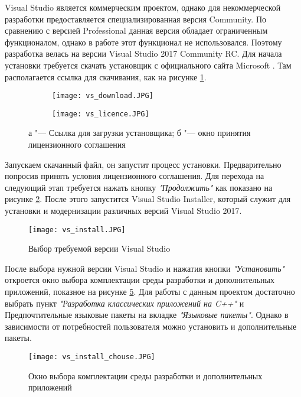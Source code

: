 Visual Studio является коммерческим проектом, однако для некоммерческой разработки предоставляется специализированная версия Community. По сравнению с версией Professional данная версия обладает ограниченным функционалом, однако в работе этот функционал не использовался. Поэтому разработка велась на версии Visual Studio 2017 Community RC. Для начала установки требуется скачать установщик с официального сайта Microsoft \cite{vs_downolad}. Там располагается ссылка для скачивания, как на рисунке \ref{fig:vs_downolad}. 
\begin{figure}[h]
    \centering
     \begin{subfigure}{0.45\textwidth}  
         \centering     
        \texttt{[image: vs\_download.JPG]}
        \caption{}
        \label{fig:vs_downolad}
    \end{subfigure}
    \begin{subfigure}{0.45\textwidth}  
        \centering
        \texttt{[image: vs\_licence.JPG]}
        \caption{}
        \label{fig:vs_licence}
    \end{subfigure}
    \caption{а "--- Ссылка для загрузки установщика; б "--- окно принятия лицензионного соглашения}
    \label{fig:vs_install1}
\end{figure}
Запускаем скачанный файл, он запустит процесс установки. Предварительно попросив принять условия лицензионного соглашения. Для перехода на следующий этап требуется нажать кнопку \textit{"Продолжить"} как показано на рисунке \ref{fig:vs_licence}. После этого запустится Visual Studio Installer, который служит для установки и модернизации различных версий Visual Studio 2017.
\begin{figure}[h]
    \centering   
    \texttt{[image: vs\_install.JPG]} 
    \caption{Выбор требуемой версии Visual Studio}
    \label{fig:vs_install2}
\end{figure}
После выбора нужной версии Visual Studio и нажатия кнопки \textit{"Установить"} откроется окно выбора комплектации среды разработки и дополнительных приложений, показное на рисунке \ref{fig:vs_install_chouse}. Для работы с данным проектом достаточно выбрать пункт \textit{"Разработка классических приложений на C++"} и Предпочтительные языковые пакеты на вкладке \textit{"Языковые пакеты"}. Однако в зависимости от потребностей пользователя можно установить и дополнительные пакеты.
\begin{figure}[h]
    \centering   
    \texttt{[image: vs\_install\_chouse.JPG]} 
    \caption{Окно выбора комплектации среды разработки и дополнительных приложений }
    \label{fig:vs_install_chouse}
\end{figure} 
